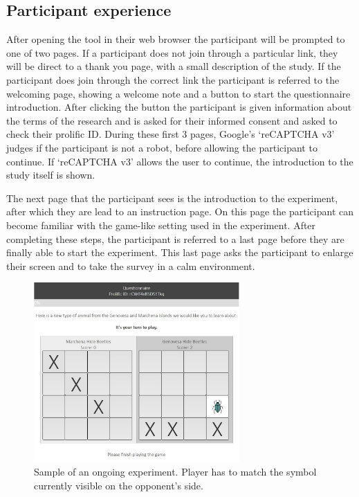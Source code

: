 \documentclass[twoside]{uva-inf-bachelor-thesis}
\theoremstyle{definition}
\begin{document}
\subsection{Participant experience}
After opening the tool in their web browser the participant will be prompted to one of two pages. If a participant does not join through a particular link, they will be direct to a thank you page, with a small description of the study.
If the participant does join through the correct link the participant is referred to the welcoming page, showing a welcome note and a button to start the questionnaire introduction. After clicking the button the participant is given information about the terms of the research and is asked for their informed consent and asked to check their prolific ID. During these first 3 pages, Google's `reCAPTCHA v3' judges if the participant is not a robot, before allowing the participant to continue. If `reCAPTCHA v3' allows the user to continue, the introduction to the study itself is shown.

The next page that the participant sees is the introduction to the experiment, after which they are lead to an instruction page. On this page the participant can become familiar with the game-like setting used in the experiment. After completing these steps, the participant is referred to a last page before they are finally able to start the experiment. This last page asks the participant to enlarge their screen and to take the survey in a calm environment.

\begin{figure}[h]
    \centering
    \includegraphics[width=0.7\textwidth]{Project/Thesis/LaTeX/images/uva_gen_example2.JPG}
    \caption{Sample of an ongoing experiment. Player has to match the symbol currently visible on the opponent's side.}
    \label{fig:example_ongoing_game}
\end{figure}
\end{document}
